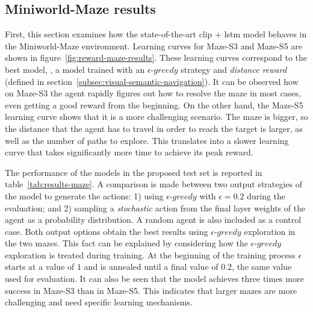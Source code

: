 \subsection{Miniworld-Maze results}\label{subsec:miniworld-maze-results}

First, this section examines how the state-of-the-art \acrshort{clip} + \acrshort{lstm} model behaves in the Miniworld-Maze environment.
Learning curves for Maze-S3 and Maze-S5 are shown in figure~\ref{fig:reward-maze-results}.
These learning curves correspond to the best model, \ie, a model trained with an $\epsilon\text{-}greedy$ strategy and \textit{distance reward} (defined in section~\ref{subsec:visual-semantic-navigation}).
It can be observed how on Maze-S3 the agent rapidly figures out how to resolve the maze in most cases, even getting a good reward from the beginning.
On the other hand, the Maze-S5 learning curve shows that it is a more challenging scenario.
The maze is bigger, so the distance that the agent has to travel in order to reach the target is larger, as well as the number of paths to explore.
This translates into a slower learning curve that takes significantly more time to achieve its peak reward.


The performance of the models in the proposed test set is reported in table~\ref{tab:results-maze}.
A comparison is made between two output strategies of the model to generate the actions:
1) using $\epsilon\text{-}greedy$ with $\epsilon=0.2$ during the evaluation;
and 2) sampling a \textit{stochastic} action from the final layer weights of the agent as a probability distribution.
A random agent is also included as a control case.
Both output options obtain the best results using $\epsilon\text{-}greedy$ exploration in the two mazes.
This fact can be explained by considering how the $\epsilon\text{-}greedy$ exploration is treated during training.
At the beginning of the training process $\epsilon$ starts at a value of $1$ and is annealed until a final value of $0.2$, the same value used for evaluation.
It can also be seen that the model achieves three times more success in Maze-S3 than in Maze-S5.
This indicates that larger mazes are more challenging and need specific learning mechanisms.

